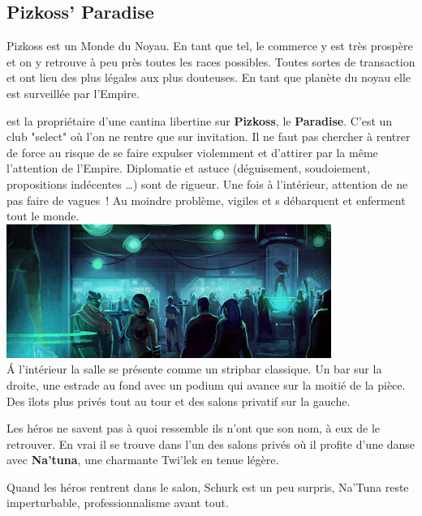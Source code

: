 \newpage
\subsection{Pizkoss’ Paradise}
Pizkoss est un Monde du Noyau. En tant que tel, le commerce y est très prospère et on y retrouve à peu près toutes les races possibles. Toutes sortes de transaction et ont lieu des plus légales aux plus douteuses. En tant que planète du noyau elle est surveillée par l’Empire.

 est la propriétaire d’une cantina libertine sur \textbf{Pizkoss}, le \textbf{Paradise}. C’est un club "select" où l’on ne rentre que sur invitation. Il ne faut pas chercher à rentrer de force au risque de se faire expulser violemment et d’attirer par la même l’attention de l’Empire. Diplomatie et astuce (déguisement, soudoiement, propositions indécentes \ldots) sont de rigueur. Une fois à l’intérieur, attention de ne pas faire de vagues~! Au moindre problème, vigiles et s débarquent et enferment tout le monde.\\

\noindent\includegraphics[width=\linewidth]{_img/places/paradise-club.jpg}\\

\'A l’intérieur la salle se présente comme un stripbar classique. Un bar sur la droite, une estrade au fond avec un podium qui avance sur la moitié de la pièce. Des îlots plus privés tout au tour et des salons privatif sur la gauche. 

Les héros ne savent pas à quoi ressemble  ils n’ont que son nom, à eux de le retrouver. En vrai il se trouve dans l’un des salons privés où il profite d’une danse avec \textbf{Na’tuna}, une charmante Twi’lek en tenue légère.

Quand les héros rentrent dans le salon, Schurk est un peu surpris, Na’Tuna reste imperturbable, professionnalisme avant tout.

